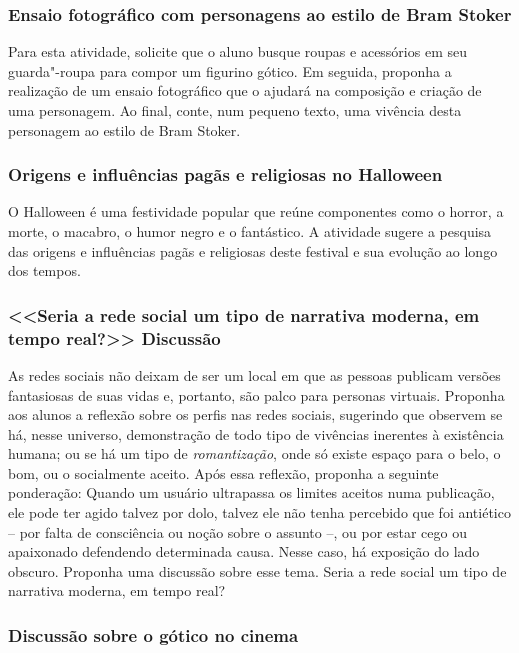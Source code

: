 \documentclass[12pt]{extarticle}
\begin{document}
\subsubsection{Ensaio fotográfico com personagens ao estilo de Bram Stoker}

Para esta atividade, solicite que o aluno busque roupas e acessórios
em seu guarda"-roupa para compor um figurino gótico. Em seguida,
proponha a realização de um ensaio fotográfico que o ajudará na
composição e criação de uma personagem. Ao final, conte, num pequeno
texto, uma vivência desta personagem ao estilo de Bram Stoker.

\subsubsection{Origens e influências pagãs e religiosas no Halloween}

O Halloween é uma festividade popular que reúne componentes como o
horror, a morte, o macabro, o humor negro e o fantástico. A atividade
sugere a pesquisa das origens e influências pagãs e religiosas deste
festival e sua evolução ao longo dos tempos.

\subsubsection{<<Seria a rede social um tipo de narrativa
moderna, em tempo real?>> Discussão}


As redes sociais não deixam de ser um local em que as pessoas publicam
versões fantasiosas de suas vidas e, portanto, são palco para personas
virtuais. Proponha aos alunos a reflexão sobre os perfis nas redes
sociais, sugerindo que observem se há, nesse universo, demonstração de
todo tipo de vivências inerentes à existência humana; ou se há um tipo
de \emph{romantização}, onde só existe espaço para o belo, o bom, ou o
socialmente aceito. Após essa reflexão, proponha a seguinte
ponderação: Quando um usuário ultrapassa os limites aceitos numa
publicação, ele pode ter agido talvez por dolo, talvez ele não tenha
percebido que foi antiético -- por falta de consciência ou noção sobre
o assunto --, ou por estar cego ou apaixonado defendendo determinada
causa. Nesse caso, há exposição do lado obscuro. Proponha uma
discussão sobre esse tema. Seria a rede social um tipo de narrativa
moderna, em tempo real?


\subsubsection{Discussão sobre o gótico no cinema}
\end{document}
